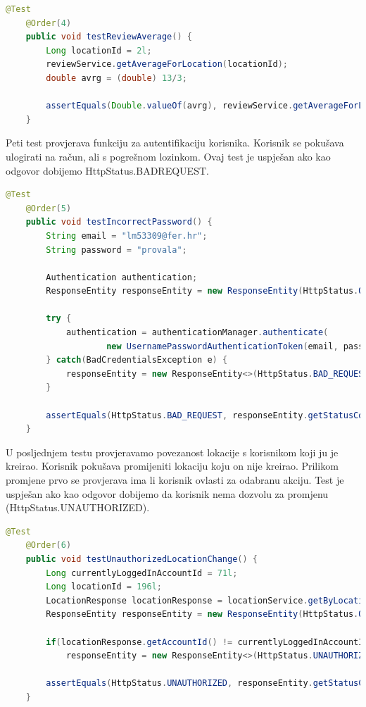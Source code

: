     \begin{lstlisting}[language=Java, breaklines=true]
    @Test
    @Order(4)
    public void testReviewAverage() {
        Long locationId = 2l;
        reviewService.getAverageForLocation(locationId);
        double avrg = (double) 13/3;

        assertEquals(Double.valueOf(avrg), reviewService.getAverageForLocation(locationId));
    }
    \end{lstlisting}

    Peti test provjerava funkciju za autentifikaciju korisnika. Korisnik se pokušava ulogirati na račun, ali s pogrešnom lozinkom. Ovaj test je uspješan ako kao odgovor dobijemo HttpStatus.BADREQUEST.

    \begin{lstlisting}[language=Java, breaklines=true]
    @Test
    @Order(5)
    public void testIncorrectPassword() {
        String email = "lm53309@fer.hr";
        String password = "provala";

        Authentication authentication;
        ResponseEntity responseEntity = new ResponseEntity(HttpStatus.OK);

        try {
            authentication = authenticationManager.authenticate(
                    new UsernamePasswordAuthenticationToken(email, password));
        } catch(BadCredentialsException e) {
            responseEntity = new ResponseEntity<>(HttpStatus.BAD_REQUEST);
        }

        assertEquals(HttpStatus.BAD_REQUEST, responseEntity.getStatusCode());
    }
    \end{lstlisting}

    U posljednjem testu provjeravamo povezanost lokacije s korisnikom koji ju je kreirao. Korisnik pokušava promijeniti lokaciju koju on nije kreirao. Prilikom promjene prvo se provjerava ima li korisnik ovlasti za odabranu akciju. Test je uspješan ako kao odgovor dobijemo da korisnik nema dozvolu za promjenu (HttpStatus.UNAUTHORIZED).

    \begin{lstlisting}[language=Java, breaklines=true]
    @Test
    @Order(6)
    public void testUnauthorizedLocationChange() {
        Long currentlyLoggedInAccountId = 71l;
        Long locationId = 196l;
        LocationResponse locationResponse = locationService.getByLocationId(locationId);
        ResponseEntity responseEntity = new ResponseEntity(HttpStatus.OK);

        if(locationResponse.getAccountId() != currentlyLoggedInAccountId)
            responseEntity = new ResponseEntity<>(HttpStatus.UNAUTHORIZED);

        assertEquals(HttpStatus.UNAUTHORIZED, responseEntity.getStatusCode());
    }
    \end{lstlisting}

